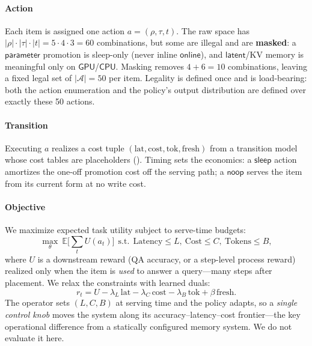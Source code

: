 \paragraph{Action} Each item is assigned one action $a=(\rho,\tau,t)$. The raw space has
$|\rho|\!\cdot\!|\tau|\!\cdot\!|t|=5\!\cdot\!4\!\cdot\!3=60$ combinations, but some are illegal and are
\textbf{masked}: a $\textsf{parameter}$ promotion is sleep-only (never inline $\textsf{online}$), and
$\textsf{latent}$/KV memory is meaningful only on $\textsf{GPU}$/$\textsf{CPU}$. Masking removes
$4+6=10$ combinations, leaving a fixed legal set of $|\mathcal{A}|=50$ per item. Legality is defined
once and is load-bearing: both the action enumeration and the policy's output distribution are defined
over exactly these 50 actions.

\paragraph{Transition} Executing $a$ realizes a cost tuple $(\text{lat},\text{cost},\text{tok},
\text{fresh})$ from a transition model whose cost tables are placeholders (). Timing sets the economics: a
$\textsf{sleep}$ action amortizes the one-off promotion cost off the serving path; a $\textsf{noop}$
serves the item from its current form at no write cost.

\paragraph{Objective} We maximize expected task utility subject to serve-time budgets:
\begin{equation}
\max_{\theta}\ \mathbb{E}\!\Big[\textstyle\sum_t U(a_t)\Big]
\ \ \text{s.t.}\ \ \text{Latency}\le L,\ \text{Cost}\le C,\ \text{Tokens}\le B ,
\end{equation}
where $U$ is a downstream reward (QA accuracy, or a step-level process reward) realized only when the
item is \emph{used} to answer a query---many steps after placement. We relax the constraints with learned
duals:
\begin{equation}
r_t = U - \lambda_L\,\text{lat} - \lambda_C\,\text{cost} - \lambda_B\,\text{tok} + \beta\,\text{fresh}.
\end{equation}
The operator sets $(L,C,B)$ at serving time and the policy adapts, so a \emph{single control knob} moves
the system along its accuracy--latency--cost frontier---the key operational difference from a statically
configured memory system. We do not evaluate it here.

